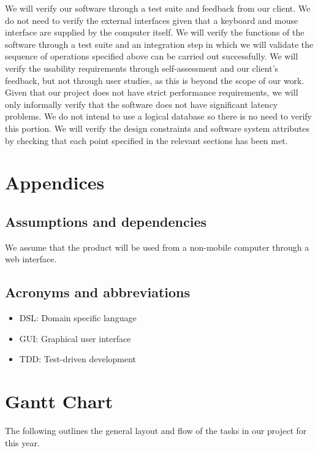 \documentclass[10pt,letter,draftclsnofoot,onecolumn]{IEEEtran}
\begin{document}
\begin{singlespace}
    We will verify our software through a test suite and feedback from our client. We do not need to verify the external interfaces given that a keyboard and mouse interface are supplied by the computer itself. We will verify the functions of the software through a test suite and an integration step in which we will validate the sequence of operations specified above can be carried out successfully. We will verify the usability requirements through self-assessment and our client's feedback, but not through user studies, as this is beyond the scope of our work. Given that our project does not have strict performance requirements, we will only informally verify that the software does not have significant latency problems. We do not intend to use a logical database so there is no need to verify this portion. We will verify the design constraints and software system attributes by checking that each point specified in the relevant sections has been met.    
\section{Appendices}
    \subsection{Assumptions and dependencies}
        We assume that the product will be used from a non-mobile computer through a web interface.
    \subsection{Acronyms and abbreviations}
        \begin{itemize}
            \item DSL: Domain specific language
            \item GUI: Graphical user interface 
            \item TDD: Test-driven development 
        \end{itemize}{}


\newpage
\section{Gantt Chart}


The following outlines the general layout and flow of the tasks in our project for this year.


\end{singlespace}
\end{document}
